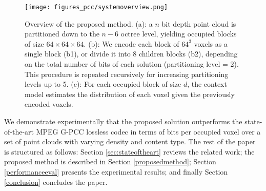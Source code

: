 \begin{figure*}
\centering
\captionsetup{justification=raggedright}
\texttt{[image: figures\_pcc/systemoverview.png]}
\vspace{0.1cm}
\caption{Overview of the proposed method. (a): a $n$ bit depth point cloud is partitioned down to the $n-6$ octree level, yielding occupied blocks of size $64\times 64 \times 64$. (b): We encode each block of $64^3$ voxels as a single block (b1), or divide it into 8 children blocks (b2), depending on the total number of bits of each solution (partitioning level = 2). This procedure is repeated recursively for increasing partitioning levels up to 5. (c): For each occupied block of size $d $, the context model estimates the distribution of each voxel given the previously encoded voxels.  }
\label{fig:system overview}
\end{figure*}

\par We demonstrate experimentally that the proposed solution
outperforms the state-of-the-art MPEG G-PCC lossless codec in terms of bits per occupied voxel over a set of point clouds with varying density and content type. The rest of the paper is structured as follows: Section \ref{sec:stateoftheart} reviews the related work; the proposed method is described in Section \ref{proposedmethod}; Section \ref{performanceeval} presents the experimental results; and finally Section \ref{conclusion} concludes the paper.
%  

